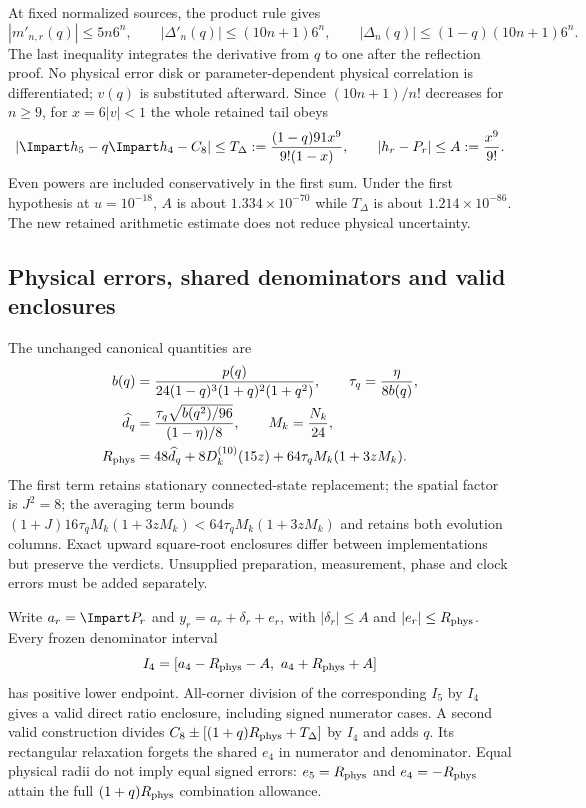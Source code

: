 At fixed normalized sources, the product rule gives
\begin{equation}
 |m'_{n,r}(q)|\le5n6^n,\qquad
 |\Delta'_n(q)|\le(10n+1)6^n,\qquad
 |\Delta_n(q)|\le(1-q)(10n+1)6^n.
 \label{r28:eq:ai3-allorder-moments}
\end{equation}
The last inequality integrates the derivative from $q$ to one after the reflection proof. No physical error disk or parameter-dependent physical correlation is differentiated; $v(q)$ is substituted afterward. Since $(10n+1)/n!$ decreases for $n\ge9$, for $x=6|v|<1$ the whole retained tail obeys
\begin{equation}
 |\Impart h_5-q\Impart h_4-C_8|
 \le T_\Delta:=\frac{(1-q)91x^9}{9!(1-x)},
 \qquad |h_r-P_r|\le A:=\frac{x^9}{9!}.
 \label{r28:eq:ai3-allorder-tail}
\end{equation}
Even powers are included conservatively in the first sum. Under the first hypothesis at $u=10^{-18}$, $A$ is about $1.334\times10^{-70}$ while $T_\Delta$ is about $1.214\times10^{-86}$. The new retained arithmetic estimate does not reduce physical uncertainty.

\subsection{Physical errors, shared denominators and valid enclosures}
The unchanged canonical quantities are
\begin{align}
 b(q)&=\frac{p(q)}{24(1-q)^3(1+q)^2(1+q^2)},\qquad
 \tau_q=\frac{\eta}{8b(q)},\notag\\
 \widehat d_q&=\frac{\tau_q\sqrt{b(q^2)/96}}{(1-\eta)/8},
 \qquad M_k=\frac{N_k}{24},\notag\\
 R_{\rm phys}&=48\widehat d_q+8D_k^{(10)}(15z)
 +64\tau_qM_k(1+3zM_k).
 \label{r28:eq:ai3-physical-radius}
\end{align}
The first term retains stationary connected-state replacement; the spatial factor is $J^2=8$; the averaging term bounds $(1+J)16\tau_qM_k(1+3zM_k)<64\tau_qM_k(1+3zM_k)$ and retains both evolution columns. Exact upward square-root enclosures differ between implementations but preserve the verdicts. Unsupplied preparation, measurement, phase and clock errors must be added separately.

Write $a_r=\Impart P_r$ and $y_r=a_r+\delta_r+e_r$, with $|\delta_r|\le A$ and $|e_r|\le R_{\rm phys}$. Every frozen denominator interval
\begin{equation}
 I_4=[a_4-R_{\rm phys}-A,\ a_4+R_{\rm phys}+A]
 \label{r28:eq:ai3-denominator}
\end{equation}
has positive lower endpoint. All-corner division of the corresponding $I_5$ by $I_4$ gives a valid direct ratio enclosure, including signed numerator cases. A second valid construction divides
$C_8\pm[(1+q)R_{\rm phys}+T_\Delta]$ by $I_4$ and adds $q$. Its rectangular relaxation forgets the shared $e_4$ in numerator and denominator. Equal physical radii do not imply equal signed errors: $e_5=R_{\rm phys}$ and $e_4=-R_{\rm phys}$ attain the full $(1+q)R_{\rm phys}$ combination allowance.


